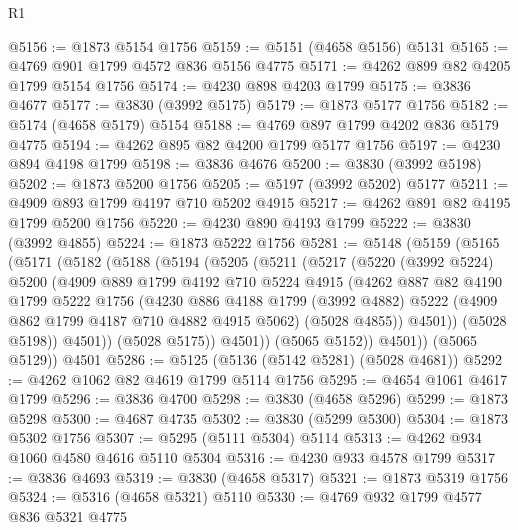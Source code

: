 \begin{lexlean}{R1}
\begin{coremodule}
@5156 := @1873 @5154 @1756
@5159 := @5151 (@4658 @5156) @5131
@5165 := @4769 @901 @1799 @4572 @836 @5156 @4775
@5171 := @4262 @899 @82 @4205 @1799 @5154 @1756
@5174 := @4230 @898 @4203 @1799
@5175 := @3836 @4677
@5177 := @3830 (@3992 @5175)
@5179 := @1873 @5177 @1756
@5182 := @5174 (@4658 @5179) @5154
@5188 := @4769 @897 @1799 @4202 @836 @5179 @4775
@5194 := @4262 @895 @82 @4200 @1799 @5177 @1756
@5197 := @4230 @894 @4198 @1799
@5198 := @3836 @4676
@5200 := @3830 (@3992 @5198)
@5202 := @1873 @5200 @1756
@5205 := @5197 (@3992 @5202) @5177
@5211 := @4909 @893 @1799 @4197 @710 @5202 @4915
@5217 := @4262 @891 @82 @4195 @1799 @5200 @1756
@5220 := @4230 @890 @4193 @1799
@5222 := @3830 (@3992 @4855)
@5224 := @1873 @5222 @1756
@5281 := @5148
    (@5159
      (@5165
        (@5171
          (@5182
            (@5188
              (@5194
                (@5205
                  (@5211
                    (@5217
                      (@5220
                        (@3992 @5224)
                        @5200
                        (@4909
                          @889
                          @1799
                          @4192
                          @710
                          @5224
                          @4915
                          (@4262
                            @887
                            @82
                            @4190
                            @1799
                            @5222
                            @1756
                            (@4230
                              @886
                              @4188
                              @1799
                              (@3992 @4882)
                              @5222
                              (@4909 @862 @1799 @4187 @710 @4882 @4915 @5062)
                              (@5028 @4855))
                            @4501))
                        (@5028 @5198))
                      @4501))
                  (@5028 @5175))
                @4501))
            (@5065 @5152))
          @4501))
      (@5065 @5129))
    @4501
@5286 := @5125 (@5136 (@5142 @5281) (@5028 @4681))
@5292 := @4262 @1062 @82 @4619 @1799 @5114 @1756
@5295 := @4654 @1061 @4617 @1799
@5296 := @3836 @4700
@5298 := @3830 (@4658 @5296)
@5299 := @1873 @5298
@5300 := @4687 @4735
@5302 := @3830 (@5299 @5300)
@5304 := @1873 @5302 @1756
@5307 := @5295 (@5111 @5304) @5114
@5313 := @4262 @934 @1060 @4580 @4616 @5110 @5304
@5316 := @4230 @933 @4578 @1799
@5317 := @3836 @4693
@5319 := @3830 (@4658 @5317)
@5321 := @1873 @5319 @1756
@5324 := @5316 (@4658 @5321) @5110
@5330 := @4769 @932 @1799 @4577 @836 @5321 @4775

\end{coremodule}
\end{lexlean}
